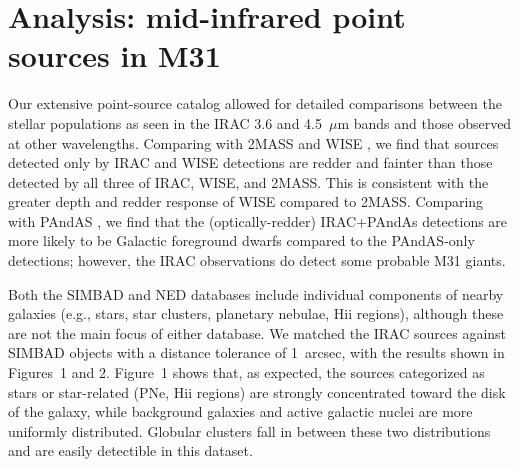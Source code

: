 \documentclass{iau}
\begin{document}
\section{Analysis: mid-infrared point sources in M31} 

Our extensive point-source catalog allowed for detailed comparisons between the stellar populations as seen in the IRAC
3.6 and 4.5~$\mu$m bands and those observed at other wavelengths. Comparing with 2MASS and WISE  \cite[(Rafiei Ravandi \etal\ 2016, Fig.\ 6)]{rr16}, 
we find that sources detected only by IRAC and WISE detections are redder and fainter than those detected by 
all three of IRAC, WISE, and 2MASS. This is consistent with the greater depth and redder response of WISE compared to 2MASS.
Comparing with PAndAS \cite[(Rafiei Ravandi \etal\ 2016, Fig.\ 7)]{rr16}, we find that the (optically-redder) IRAC+PAndAs detections are more likely to be
Galactic foreground  dwarfs compared to the PAndAS-only detections; however, the IRAC observations do detect some probable M31 giants.

Both the SIMBAD and NED databases include individual components of nearby galaxies (e.g., stars, star clusters, planetary nebulae, H{\sc ii} regions),
although these are not the main focus of either database. We matched the IRAC sources against SIMBAD objects with a
distance tolerance of 1~arcsec, with the results shown in Figures~1 and 2.
Figure~1 shows that, as expected, the sources
categorized as stars or star-related (PNe, H{\sc ii} regions) are strongly concentrated toward the disk of the galaxy, while background
galaxies and active galactic nuclei are more uniformly distributed. Globular clusters fall in between these two distributions and
are easily detectible in this dataset.
\end{document}
